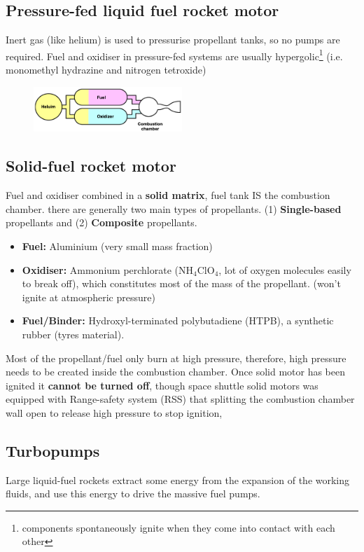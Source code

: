 \documentclass[a4paper,10pt]{article}
\begin{document}
\subsection{Pressure-fed liquid fuel rocket motor}
Inert gas (like helium) is used to pressurise propellant tanks, so no pumps are required. Fuel and oxidiser in pressure-fed systems are usually hypergolic\footnote{components spontaneously ignite when they come into contact with each other} (i.e. monomethyl hydrazine and nitrogen tetroxide) 
\begin{figure}[H]
    \centering
    \includegraphics[width=0.5\textwidth]{Figure/pressure-fed.png}
\end{figure}

\vspace*{-0.3cm}
\subsection{Solid-fuel rocket motor}
Fuel and oxidiser combined in a \textbf{solid matrix}, fuel tank IS the combustion chamber. there are generally two main types of propellants. (1) \textbf{Single-based} propellants and (2) \textbf{Composite} propellants. 
\begin{itemize}
    \item \textbf{Fuel:} Aluminium (very small mass fraction)
    \item \textbf{Oxidiser:} Ammonium perchlorate (NH$_4$ClO$_4$, lot of oxygen molecules easily to break off), which constitutes most of the mass of the propellant. (won't ignite at atmospheric pressure)
    \item \textbf{Fuel/Binder:}  Hydroxyl-terminated polybutadiene (HTPB), a synthetic rubber (tyres material).
\end{itemize}
Most of the propellant/fuel only burn at high pressure, therefore, high pressure needs to be created inside the combustion chamber. Once solid motor has been ignited it \textbf{cannot be turned off}, though space shuttle solid motors was equipped with Range-safety system (RSS) that splitting the combustion chamber wall open to release high pressure to stop ignition,

\subsection{Turbopumps}
Large liquid-fuel rockets extract some energy from the expansion of the working fluids, and use this energy to drive the massive fuel pumps.
\end{document}
